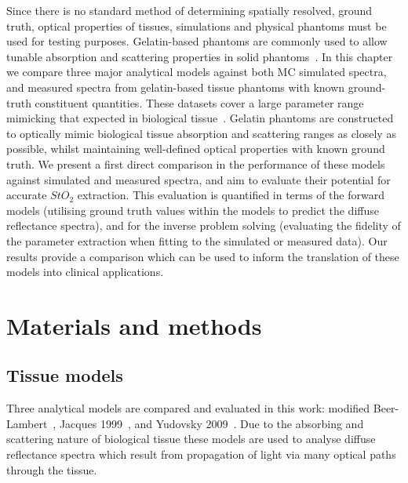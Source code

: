 Since there is no standard method of determining spatially resolved, ground truth, optical properties of tissues, 
simulations and physical
phantoms must be used
for testing purposes.
Gelatin-based phantoms are commonly used to allow tunable absorption and scattering properties in solid phantoms~\citep{Pogue2006, Gautam2023}.
%
In this chapter we compare three major analytical models against both MC simulated spectra, and measured spectra from gelatin-based tissue phantoms with known ground-truth constituent quantities. These datasets cover a large parameter range mimicking that expected in biological tissue~\citep{Jacques2013}. Gelatin phantoms are constructed to optically mimic biological tissue absorption and scattering ranges as closely as possible, whilst maintaining well-defined optical properties with known ground truth. We present a first direct comparison in the performance of these models against simulated and measured spectra, and aim to evaluate their potential for accurate $StO_2$ extraction. This evaluation is quantified in terms of the forward models (utilising ground truth values within the models to predict the diffuse reflectance spectra), and for the inverse problem solving (evaluating the fidelity of the parameter extraction when fitting to the simulated or measured data).
Our results provide a comparison which can be used to inform the translation of these models into clinical applications.

\section{Materials and methods}\label{sec:methods}
\subsection{Tissue models}\label{sec:methodtissuemodels}
Three analytical models are compared and evaluated in this work: modified Beer-Lambert~\citep{Clancy2015}, Jacques 1999~\citep{Jacques1999}, and Yudovsky 2009~\citep{Yudovsky2009}. Due to the absorbing and scattering nature of biological tissue these models are used to analyse diffuse reflectance spectra which result from propagation of light via many optical paths through the tissue.

